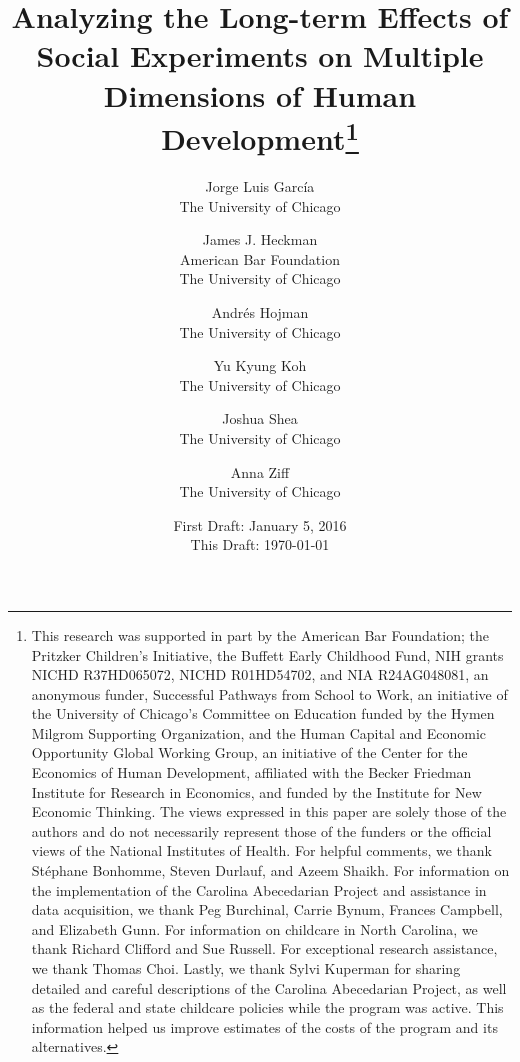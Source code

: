 

% 


\title{\Large \textbf{Analyzing the Long-term Effects of Social Experiments on Multiple Dimensions of Human Development}\thanks{This research was supported in part by the American Bar Foundation; the Pritzker Children's Initiative, the
Buffett Early Childhood Fund, NIH grants NICHD R37HD065072, NICHD R01HD54702, and NIA R24AG048081, an
anonymous funder, Successful Pathways from School to Work, an initiative of the University of Chicago's Committee
on Education funded by the Hymen Milgrom Supporting Organization, and the Human Capital and Economic
Opportunity Global Working Group, an initiative of the Center for the Economics of Human Development, affiliated with
the Becker Friedman Institute for Research in Economics, and funded by the Institute for New Economic Thinking. The
views expressed in this paper are solely those of the authors and do not necessarily represent those of the funders or
the official views of the National Institutes of Health. For helpful comments, we thank St\'{e}phane Bonhomme, Steven Durlauf, and Azeem Shaikh. For information on the implementation of the Carolina Abecedarian Project and assistance in data acquisition, we thank Peg Burchinal, Carrie Bynum, Frances Campbell, and Elizabeth Gunn. For information on childcare in North Carolina, we thank Richard Clifford and Sue Russell. For exceptional research assistance, we thank Thomas Choi. Lastly, we thank Sylvi Kuperman for sharing detailed and careful descriptions of the Carolina Abecedarian Project, as well as the federal and state childcare policies while the program was active. This information helped us improve estimates of the costs of the program and its alternatives.}}

\author{
Jorge Luis Garc\'{i}a\\
The University of Chicago \and
James J. Heckman \\
American Bar Foundation \\
The University of Chicago \and
Andr\'{e}s Hojman\\
The University of Chicago \and
Yu Kyung Koh \\ 
The University of Chicago \and
Joshua Shea \\
The University of Chicago \and
Anna Ziff \\ 
The University of Chicago}
\date{First Draft: January 5, 2016\\ This Draft: \today}
\maketitle

